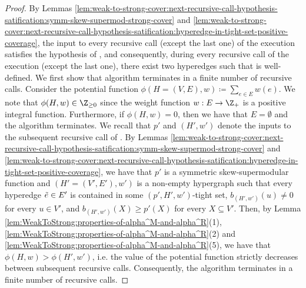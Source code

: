 \begin{proof}
By Lemmas \ref{lem:weak-to-strong-cover:next-recursive-call-hypothesis-satification:symm-skew-supermod-strong-cover} and \ref{lem:weak-to-strong-cover:next-recursive-call-hypothesis-satification:hyperedge-in-tight-set-positive-coverage}, the input to every recursive call (except the last one) of the execution satisfies the hypothesis of , and consequently, during every recursive call of the execution (except the last one), there exist two hyperedges such that   is well-defined.
We first show that 
algorithm terminates in a finite number of recursive calls. 
Consider the potential function $\phi(H=(V, E), w) \coloneqq  \sum_{e \in E}w(e)$. We note that $\phi(H, w) \in \Z_{\geq 0}$ since the weight function $w:E\rightarrow\Z_+$ is a positive integral function. Furthermore, if $\phi(H, w) = 0$, then we have that $E = \emptyset$ and the algorithm terminates. We recall that $p'$ and $(H', w')$ denote the inputs to the subsequent recursive call of . 
By Lemmas \ref{lem:weak-to-strong-cover:next-recursive-call-hypothesis-satification:symm-skew-supermod-strong-cover} and \ref{lem:weak-to-strong-cover:next-recursive-call-hypothesis-satification:hyperedge-in-tight-set-positive-coverage}, we have that $p'$ is a symmetric skew-supermodular function and $(H' = (V', E'), w')$ is a non-empty hypergraph such that every hyperedge $\Tilde{e} \in E'$ is contained in some $(p', H', w')$-tight set, $b_{(H', w')}(u) \not = 0$ for every $u \in V'$, and $b_{(H', w')}(X) \geq p'(X)$ for every $X \subseteq V'$.
Then, by Lemma \ref{lem:WeakToStrong:properties-of-alpha^M-and-alpha^R}(1), \ref{lem:WeakToStrong:properties-of-alpha^M-and-alpha^R}(2) and \ref{lem:WeakToStrong:properties-of-alpha^M-and-alpha^R}(5), we have that $\phi(H, w) > \phi(H', w')$, i.e. the value of the potential function strictly decreases between subsequent recursive calls. Consequently, the algorithm terminates in a finite number of recursive calls.



\end{proof}
